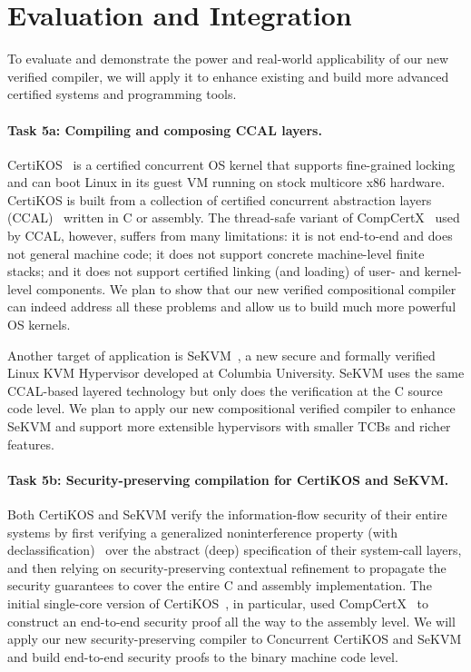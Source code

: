 \section{Evaluation and Integration}

To evaluate and demonstrate the power and real-world applicability of
our new verified compiler, we will apply it to enhance existing and
build more advanced certified systems and programming tools.

\vspace*{-2ex}
\paragraph*{Task 5a: Compiling and composing CCAL layers.}
CertiKOS~\cite{certikos-osdi16} is a certified concurrent OS kernel
that supports fine-grained locking and can boot Linux in its guest VM
running on stock multicore x86 hardware.  CertiKOS is built from a
collection of certified concurrent abstraction layers
(CCAL)~\cite{ccal18} written in C or assembly.  The thread-safe
variant of CompCertX~\cite{dscal15} used by CCAL, however, suffers
from many limitations: it is not end-to-end and does not general
machine code; it does not support concrete machine-level finite
stacks; and it does not support certified linking (and loading) of
user- and kernel-level components. We plan to show that our new
verified compositional compiler can indeed address all these problems
and allow us to build much more powerful OS kernels.

Another target of application is SeKVM~\cite{sekvm21a,sekvm21b,tao21},
a new secure and formally verified Linux KVM Hypervisor developed at
Columbia University. SeKVM uses the same CCAL-based layered technology 
but only does the verification at the C source code level. We plan to
apply our new compositional verified compiler to enhance SeKVM and support
more extensible hypervisors with smaller TCBs and richer features.

\vspace*{-2ex}
\paragraph*{Task 5b: Security-preserving compilation for CertiKOS and SeKVM.}
Both CertiKOS and SeKVM verify the information-flow security of their
entire systems by first verifying a generalized noninterference
property (with declassification)~\cite{costanzo16} over the abstract
(deep) specification of their system-call layers, and then relying on
security-preserving contextual refinement to propagate the security
guarantees to cover the entire C and assembly implementation. The
initial single-core version of CertiKOS~\cite{costanzo16}, in
particular, used CompCertX~\cite{dscal15} to construct an end-to-end
security proof all the way to the assembly level.  We will apply our
new security-preserving compiler to Concurrent CertiKOS and SeKVM and
build end-to-end security proofs to the binary machine code level.

